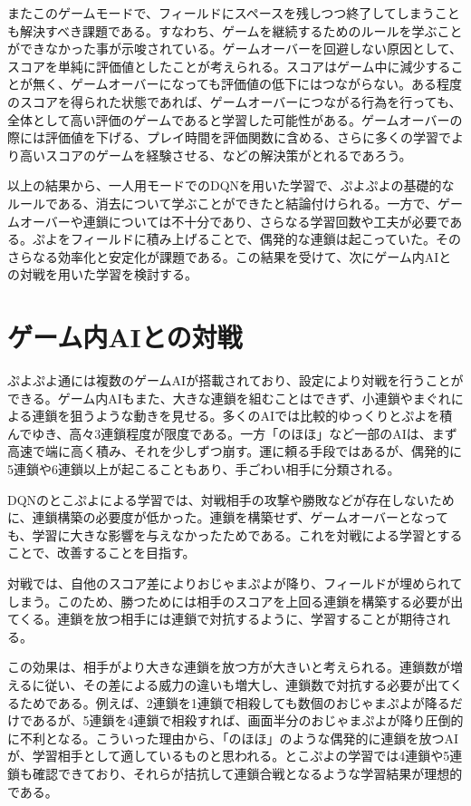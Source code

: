 \documentclass[12pt]{jreport}
\begin{document}
またこのゲームモードで、フィールドにスペースを残しつつ終了してしまうことも解決すべき課題である。すなわち、ゲームを継続するためのルールを学ぶことができなかった事が示唆されている。ゲームオーバーを回避しない原因として、スコアを単純に評価値としたことが考えられる。スコアはゲーム中に減少することが無く、ゲームオーバーになっても評価値の低下にはつながらない。ある程度のスコアを得られた状態であれば、ゲームオーバーにつながる行為を行っても、全体として高い評価のゲームであると学習した可能性がある。ゲームオーバーの際には評価値を下げる、プレイ時間を評価関数に含める、さらに多くの学習でより高いスコアのゲームを経験させる、などの解決策がとれるであろう。

以上の結果から、一人用モードでのDQNを用いた学習で、ぷよぷよの基礎的なルールである、消去について学ぶことができたと結論付けられる。一方で、ゲームオーバーや連鎖については不十分であり、さらなる学習回数や工夫が必要である。ぷよをフィールドに積み上げることで、偶発的な連鎖は起こっていた。そのさらなる効率化と安定化が課題である。この結果を受けて、次にゲーム内AIとの対戦を用いた学習を検討する。


\section{ゲーム内AIとの対戦}
ぷよぷよ通には複数のゲームAIが搭載されており、設定により対戦を行うことができる。ゲーム内AIもまた、大きな連鎖を組むことはできず、小連鎖やまぐれによる連鎖を狙うような動きを見せる。多くのAIでは比較的ゆっくりとぷよを積んでゆき、高々3連鎖程度が限度である。一方「のほほ」など一部のAIは、まず高速で端に高く積み、それを少しずつ崩す。運に頼る手段ではあるが、偶発的に5連鎖や6連鎖以上が起こることもあり、手ごわい相手に分類される。

DQNのとこぷよによる学習では、対戦相手の攻撃や勝敗などが存在しないために、連鎖構築の必要度が低かった。連鎖を構築せず、ゲームオーバーとなっても、学習に大きな影響を与えなかったためである。これを対戦による学習とすることで、改善することを目指す。

対戦では、自他のスコア差によりおじゃまぷよが降り、フィールドが埋められてしまう。このため、勝つためには相手のスコアを上回る連鎖を構築する必要が出てくる。連鎖を放つ相手には連鎖で対抗するように、学習することが期待される。

この効果は、相手がより大きな連鎖を放つ方が大きいと考えられる。連鎖数が増えるに従い、その差による威力の違いも増大し、連鎖数で対抗する必要が出てくるためである。例えば、2連鎖を1連鎖で相殺しても数個のおじゃまぷよが降るだけであるが、5連鎖を4連鎖で相殺すれば、画面半分のおじゃまぷよが降り圧倒的に不利となる。こういった理由から、「のほほ」のような偶発的に連鎖を放つAIが、学習相手として適しているものと思われる。とこぷよの学習では4連鎖や5連鎖も確認できており、それらが拮抗して連鎖合戦となるような学習結果が理想的である。
\end{document}
